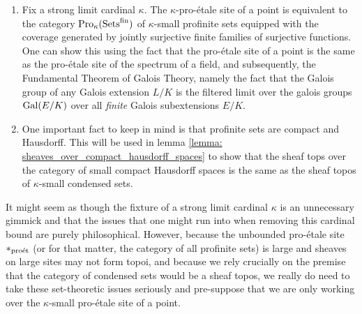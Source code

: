                 \begin{remark} \label{remark: condensation_and_profiniteness}
                    \noindent
                    \begin{enumerate}
                        \item Fix a strong limit cardinal $\kappa$. The $\kappa$-pro-\'etale site of a point is equivalent to the category $\mathrm{Pro}_{\kappa}(\mathrm{Sets}^{\mathrm{fin}})$ of $\kappa$-small profinite sets equipped with the coverage generated by jointly surjective finite families of surjective functions. One can show this using the fact that the pro-\'etale site of a point is the same as the pro-\'etale site of the spectrum of a field, and subsequently, the Fundamental Theorem of Galois Theory, namely the fact that the Galois group of any Galois extension $L/K$ is the filtered limit over the galois groups $\mathrm{Gal}(E/K)$ over all \textit{finite} Galois subextensions $E/K$.
                        \item One important fact to keep in mind is that profinite sets are compact and Hausdorff. This will be used in lemma \ref{lemma: sheaves_over_compact_hausdorff_spaces} to show that the sheaf tops over the category of small compact Hausdorff spaces is the same as the sheaf topos of $\kappa$-small condensed sets.
                    \end{enumerate}
                \end{remark}
                \begin{remark} \label{remark: condensed_sets_set_theoretic_issues}
                    It might seem as though the fixture of a strong limit cardinal $\kappa$ is an unnecessary gimmick and that the issues that one might run into when removing this cardinal bound are purely philosophical. However, because the unbounded pro-\'etale site $*_{\mathrm{pro\acute{e}t}}$ (or for that matter, the category of all profinite sets) is large and sheaves on large sites may not form topoi, and because we rely crucially on the premise that the category of condensed sets would be a sheaf topos, we really do need to take these set-theoretic issues seriously and pre-suppose that we are only working over the $\kappa$-small pro-\'etale site of a point.
                \end{remark}
                
